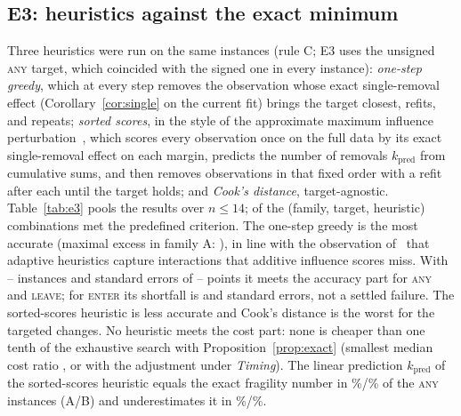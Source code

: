 \documentclass[10pt,a4paper]{article}
\theoremstyle{plain}
\theoremstyle{definition}
\theoremstyle{remark}
\newcommand{\tsc}[1]{\textnormal{\textsc{#1}}}  %
\begin{document}
\subsection{E3: heuristics against the exact minimum}
Three heuristics were run on the same instances (rule C; E3 uses the unsigned \tsc{any} target, which coincided with the signed one in every instance): \emph{one-step greedy}, which at every step removes the observation whose exact single-removal effect (Corollary~\ref{cor:single} on the current fit) brings the target closest, refits, and repeats; \emph{sorted scores}, in the style of the approximate maximum influence perturbation~\citep{broderick2020}, which scores every observation once on the full data by its exact single-removal effect on each margin, predicts the number of removals $k_{\mathrm{pred}}$ from cumulative sums, and then removes observations in that fixed order with a refit after each until the target holds; and \emph{Cook's distance}, target-agnostic. Table~\ref{tab:e3} pools the results over $n\le14$; \EthreeNumAdvantage{} of the \EthreeNumVerdicts{} (family, target, heuristic) combinations met the predefined criterion. The one-step greedy is the most accurate (maximal excess in family A: \EthreeAOnestepMaxGap), in line with the observation of~\citet{hu2024} that adaptive heuristics capture interactions that additive influence scores miss. With \EthreeNMin--\EthreeNMax{} instances and standard errors of \EthreeSEMin--\EthreeSEMax{} points it meets the accuracy part for \tsc{any} and \tsc{leave}; for \tsc{enter} its shortfall is \EthreeAEnterOnestepShortfallSE{} and \EthreeBEnterOnestepShortfallSE{} standard errors, not a settled failure. The sorted-scores heuristic is less accurate and Cook's distance is the worst for the targeted changes. No heuristic meets the cost part: none is cheaper than one tenth of the exhaustive search with Proposition~\ref{prop:exact} (smallest median cost ratio \EthreeMinCostRaw, or \EthreeMinCostAdjusted{} with the adjustment under \emph{Timing}). The linear prediction $k_{\mathrm{pred}}$ of the sorted-scores heuristic equals the exact fragility number in \EthreeAAnyKpredExact\%/\EthreeBAnyKpredExact\% of the \tsc{any} instances (A/B) and underestimates it in \EthreeAAnyKpredUnder\%/\EthreeBAnyKpredUnder\%.
\end{document}
